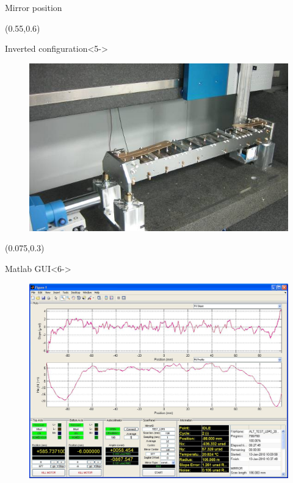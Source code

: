 \documentclass{beamer}
\begin{document}
\begin{frame}
\begin{textblock*}{45mm}
\begin{exampleblock}{Mirror position}
\begin{figure}
            \end{figure}
        \end{exampleblock}
    \end{textblock*}
    \begin{textblock*}{45mm}(0.55\textwidth,0.6\textheight)
        \begin{exampleblock}{Inverted configuration}<5->
            \begin{figure}
                \includegraphics[width=\textwidth]{imgs/alba/laop/04_detall_LTP_inverted_configuration.jpg}
            \end{figure}
        \end{exampleblock}
    \end{textblock*}
    \begin{textblock*}{45mm}(0.075\textwidth,0.3\textheight)
        \begin{block}{Matlab GUI}<6->
            \begin{figure}
                \includegraphics[width=\textwidth]{imgs/alba/laop/05_ltp_matlabgui.jpg}

\end{figure}
\end{block}
\end{textblock*}
\end{frame}
\end{document}
